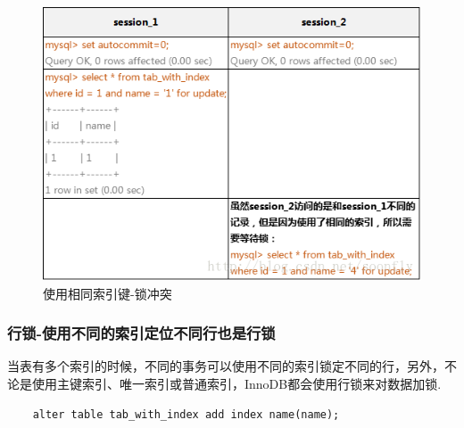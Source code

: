 \documentclass[UTF8,a4paper,12pt]{ctexbook}
\begin{document}
				\begin{figure}[H]
					\centering
					\includegraphics[width=13cm]{lock-row2}
					\caption{使用相同索引键-锁冲突}
				\end{figure}
			
			
			\subsubsection{行锁-使用不同的索引定位不同行也是行锁}	
				当表有多个索引的时候，不同的事务可以使用不同的索引锁定不同的行，另外，不论是使用主键索引、唯一索引或普通索引，InnoDB都会使用行锁来对数据加锁.
				
				\begin{lstlisting}
	alter table tab_with_index add index name(name);			
				\end{lstlisting}
			
\end{document}
